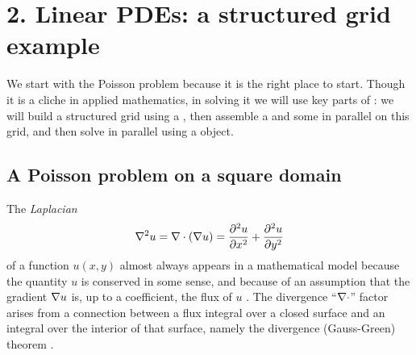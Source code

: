 
\chapter{2. Linear PDEs: a structured grid example}

We start with the Poisson problem because it is the right place to start.  Though it is a cliche in applied mathematics, in solving it we will use key parts of \PETSc: we will build a structured grid using a \PETSc \pDMDA, then assemble a \pMat and some \pVecs in parallel on this grid, and then solve in parallel using a \pKSP object.

\section{A Poisson problem on a square domain}

The \emph{Laplacian}
    $$\nabla^2 u = \nabla\cdot(\nabla u) = \frac{\partial^2 u}{\partial x^2} + \frac{\partial^2 u}{\partial y^2}$$
of a function $u(x,y)$ almost always appears in a mathematical model because the quantity $u$ is conserved in some sense, and because of an assumption that the gradient $\nabla u$ is, up to a coefficient, the flux of $u$ \citep{Ockendonetal2003}.  The divergence ``$\nabla\cdot$'' factor arises from a connection between a flux integral over a closed surface and an integral over the interior of that surface, namely the divergence (Gauss-Green) theorem \citep[Appendix C]{Evans}.

